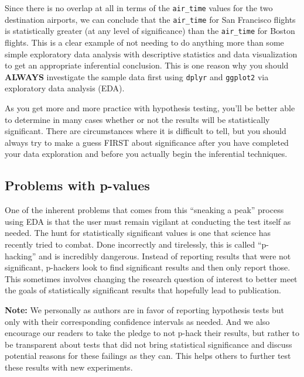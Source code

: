 \documentclass[12pt, krantz2,]{krantz}
\begin{document}
Since there is no overlap at all in terms of the \texttt{air\_time} values for the two destination airports, we can conclude that the \texttt{air\_time} for San Francisco flights is statistically greater (at any level of significance) than the \texttt{air\_time} for Boston flights. This is a clear example of not needing to do anything more than some simple exploratory data analysis with descriptive statistics and data visualization to get an appropriate inferential conclusion. This is one reason why you should \textbf{ALWAYS} investigate the sample data first using \texttt{dplyr} and \texttt{ggplot2} via exploratory data analysis (EDA).

As you get more and more practice with hypothesis testing, you'll be better able to determine in many cases whether or not the results will be statistically significant. There are circumstances where it is difficult to tell, but you should always try to make a guess FIRST about significance after you have completed your data exploration and before you actually begin the inferential techniques.

\hypertarget{problems-with-p-values}{%
\subsection{Problems with p-values}\label{problems-with-p-values}}

One of the inherent problems that comes from this ``sneaking a peak'' process using EDA is that the user must remain vigilant at conducting the test itself as needed. The hunt for statistically significant values is one that science has recently tried to combat. Done incorrectly and tirelessly, this is called ``p-hacking'' and is incredibly dangerous. Instead of reporting results that were not significant, p-hackers look to find significant results and then only report those. This sometimes involves changing the research question of interest to better meet the goals of statistically significant results that hopefully lead to publication.

\textbf{Note:} We personally as authors are in favor of reporting hypothesis tests but only with their corresponding confidence intervals as needed. And we also encourage our readers to take the pledge to not p-hack their results, but rather to be transparent about tests that did not bring statistical significance and discuss potential reasons for these failings as they can. This helps others to further test these results with new experiments.
\end{document}
